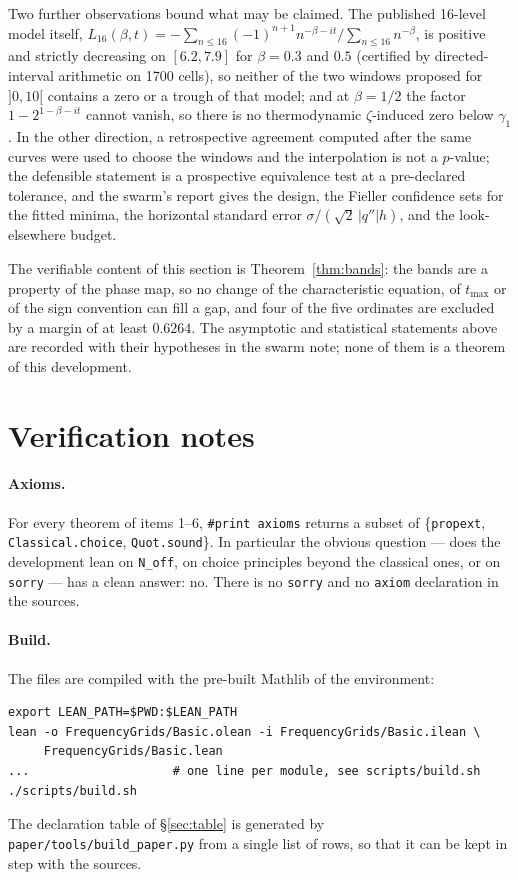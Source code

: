\documentclass[11pt,a4paper]{article}
\newcommand{\lb}{\_\allowbreak}
\newcommand{\code}[1]{\texttt{#1}}
\theoremstyle{definition}
\theoremstyle{remark}
\begin{document}
Two further observations bound what may be claimed. The published 16-level model itself,
$L_{16}(\beta,t) = -\sum_{n\le 16}(-1)^{n+1}n^{-\beta-it}\big/\sum_{n\le 16}n^{-\beta}$, is positive
and strictly decreasing on $[6.2,7.9]$ for $\beta = 0.3$ and $0.5$ (certified by directed-interval
arithmetic on 1700 cells), so neither of the two windows proposed for $]0,10[$ contains a zero or a
trough of that model; and at $\beta = 1/2$ the factor $1-2^{1-\beta-it}$ cannot vanish, so there is
no thermodynamic $\zeta$-induced zero below $\gamma_1$. In the other direction, a retrospective
agreement computed after the same curves were used to choose the windows and the interpolation is
not a $p$-value; the defensible statement is a prospective equivalence test at a pre-declared
tolerance, and the swarm's report gives the design, the Fieller confidence sets for the fitted
minima, the horizontal standard error $\sigma/(\sqrt2\,|q''|h)$, and the look-elsewhere budget.

\noindent
The verifiable content of this section is Theorem~\ref{thm:bands}: the bands are a property of the
phase map, so no change of the characteristic equation, of $t_{\max}$ or of the sign convention can
fill a gap, and four of the five ordinates are excluded by a margin of at least $0.6264$. The
asymptotic and statistical statements above are recorded with their hypotheses in the swarm note;
none of them is a theorem of this development.

\section{Verification notes}\label{sec:verif}

\paragraph{Axioms.} For every theorem of items 1--6, \code{\#print axioms} returns a subset
of \{\code{propext}, \code{Classical.choice}, \code{Quot.sound}\}.  In particular the
obvious question --- does the development lean on \code{N\lb off}, on choice principles
beyond the classical ones, or on \code{sorry} --- has a clean answer: no.  There is no
\code{sorry} and no \code{axiom} declaration in the sources.

\paragraph{Build.} The files are compiled with the pre-built Mathlib of the environment:
\begin{verbatim}
export LEAN_PATH=$PWD:$LEAN_PATH
lean -o FrequencyGrids/Basic.olean -i FrequencyGrids/Basic.ilean \
     FrequencyGrids/Basic.lean
...                    # one line per module, see scripts/build.sh
./scripts/build.sh
\end{verbatim}
The declaration table of \S\ref{sec:table} is generated by
\code{paper/tools/build\lb paper.py} from a single list of rows, so that it can be kept in
step with the sources.
\end{document}
